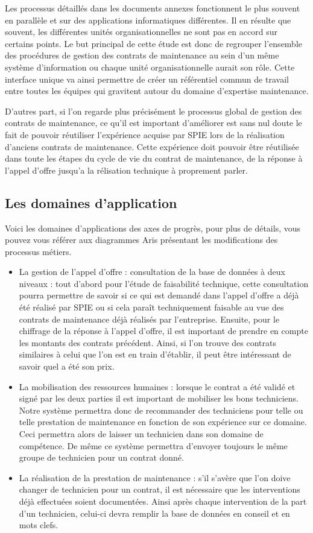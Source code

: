 Les processus détaillés dans les documents annexes fonctionnent le plus souvent en parallèle et sur des applications informatiques différentes. Il en résulte que souvent, les différentes unités organisationnelles ne sont pas en accord sur certains points. Le but principal de cette étude est donc de regrouper l'ensemble des procédures de gestion des contrats de maintenance au sein d'un même système d'information ou chaque unité organisationnelle aurait son rôle. Cette interface unique va ainsi permettre de créer un référentiel commun de travail entre toutes les équipes qui gravitent autour du domaine d'expertise maintenance. 

D'autres part, si l'on regarde plus précisément le processus global de gestion des contrats de maintenance, ce qu'il est important d'améliorer est sans nul doute le fait de pouvoir réutiliser l'expérience acquise par SPIE lors de la réalisation d'anciens contrats de maintenance. Cette expérience doit pouvoir être réutilisée dans toute les étapes du cycle de vie du contrat de maintenance, de la réponse à l'appel d'offre jusqu'a la rélisation technique à proprement parler.

\subsection {Les domaines d'application}
Voici les domaines d'applications des axes de progrès, pour plus de détails, vous pouvez vous référer aux diagrammes Aris présentant les modifications des processus métiers.
\begin{itemize}
\item La gestion de l'appel d'offre : consultation de la base de données à deux niveaux : tout d'abord pour l'étude de faisabilité technique, cette consultation pourra permettre de savoir si ce qui est demandé dans l'appel d'offre a déjà été réalisé par SPIE ou si cela paraît techniquement faisable au vue des contrats de maintenance déjà réalisés par l'entreprise. Ensuite, pour le chiffrage de la réponse à l'appel d'offre, il est important de prendre en compte les montants des contrats précédent. Ainsi, si l'on trouve des contrats similaires à celui que l'on est en train d'établir, il peut être intéressant de savoir quel a été son prix.
\item La mobilisation des ressources humaines : lorsque le contrat a été validé et signé par les deux parties il est important de mobiliser les bons techniciens. Notre système permettra donc de recommander des techniciens pour telle ou telle prestation de maintenance en fonction de son expérience sur ce domaine. Ceci permettra alors de laisser un technicien dans son domaine de compétence. De même ce système permettra d'envoyer toujours le même groupe de technicien pour un contrat donné.
\item La réalisation de la prestation de maintenance : s'il s'avère que l'on doive changer de technicien pour un contrat, il est nécessaire que les interventions déjà effectuées soient documentées. Ainsi après chaque intervention de la part d'un technicien, celui-ci devra remplir la base de données en conseil et en mots clefs.
\end{itemize}

